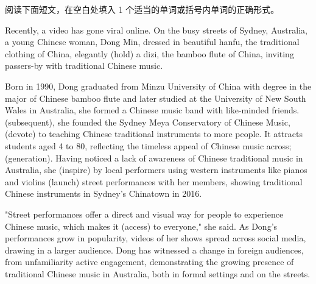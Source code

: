 \documentclass{英语试卷}
\begin{document}
\par 阅读下面短文，在空白处填入 1 个适当的单词或括号内单词的正确形式。\par
\par Recently, a video has gone viral online. On the busy streets of Sydney, Australia, a young Chinese woman, Dong Min, dressed in beautiful hanfu, the traditional clothing of China, elegantly  (hold) a dizi, the bamboo flute of China, inviting passers-by with traditional Chinese music.\par
\par Born in 1990, Dong graduated from Minzu University of China with  degree in the major of Chinese bamboo flute and later studied at the University of New South Wales in Australia,  she formed a Chinese music band with like-minded friends.  (subsequent), she founded the Sydney Meya Conservatory of Chinese Music,  (devote) to teaching Chinese traditional instruments to more people. It attracts students aged 4 to 80, reflecting the timeless appeal of Chinese music across;  (generation). Having noticed a lack of awareness of Chinese traditional music in Australia, she  (inspire) by local performers using western instruments like pianos and violins  (launch) street performances with her members, showing traditional Chinese instruments in Sydney's Chinatown in 2016.\par
\par "Street performances offer a direct and visual way for people to experience Chinese music, which makes it  (access) to everyone," she said. As Dong's performances grow in popularity, videos of her shows spread across social media, drawing in a larger audience. Dong has witnessed a change in foreign audiences, from unfamiliarity  active engagement, demonstrating the growing presence of traditional Chinese music in Australia, both in formal settings and on the streets.\par
{}
\end{document}
